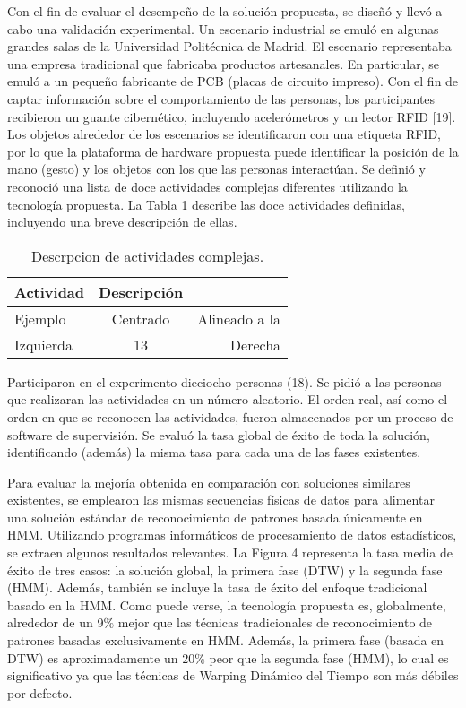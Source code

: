 \documentclass[a4paper]{article}
\begin{document}
Con el fin de evaluar el desempeño de la solución propuesta, se diseñó y llevó a cabo una validación experimental. Un escenario industrial se emuló en algunas grandes salas de la Universidad Politécnica de Madrid. El escenario representaba una empresa tradicional que fabricaba productos artesanales. En particular, se emuló a un pequeño fabricante de PCB (placas de circuito impreso).
Con el fin de captar información sobre el comportamiento de las personas, los participantes recibieron un guante cibernético, incluyendo acelerómetros y un lector RFID [19]. Los objetos alrededor de los escenarios se identificaron con una etiqueta RFID, por lo que la plataforma de hardware propuesta puede identificar la posición de la mano (gesto) y los objetos con los que las personas interactúan.
Se definió y reconoció una lista de doce actividades complejas diferentes utilizando la tecnología propuesta. La Tabla 1 describe las doce actividades definidas, incluyendo una breve descripción de ellas.


\begin{table}
\centering
\begin{tabular}{l c r} 
Actividad & Descripción \\ \hline
Ejemplo & Centrado & Alineado a la\\
Izquierda & 13 & Derecha
\end{tabular}
\caption{\label{tab:tabla ejemplo}Descrpcion de actividades complejas.}
\end{table}

Participaron en el experimento dieciocho personas (18). Se pidió a las personas que realizaran las actividades en un número aleatorio. El orden real, así como el orden en que se reconocen las actividades, fueron almacenados por un proceso de software de supervisión. Se evaluó la tasa global de éxito de toda la solución, identificando (además) la misma tasa para cada una de las fases existentes.

Para evaluar la mejoría obtenida en comparación con soluciones similares existentes, se emplearon las mismas secuencias físicas de datos para alimentar una solución estándar de reconocimiento de patrones basada únicamente en HMM. Utilizando programas informáticos de procesamiento de datos estadísticos, se extraen algunos resultados relevantes.
La Figura 4 representa la tasa media de éxito de tres casos: la solución global, la primera fase (DTW) y la segunda fase (HMM). Además, también se incluye la tasa de éxito del enfoque tradicional basado en la HMM. Como puede verse, la tecnología propuesta es, globalmente, alrededor de un 9$\%$ mejor que las técnicas tradicionales de reconocimiento de patrones basadas exclusivamente en HMM. Además, la primera fase (basada en DTW) es aproximadamente un 20$\%$ peor que la segunda fase (HMM), lo cual es significativo ya que las técnicas de Warping Dinámico del Tiempo son más débiles por defecto.
\end{document}
